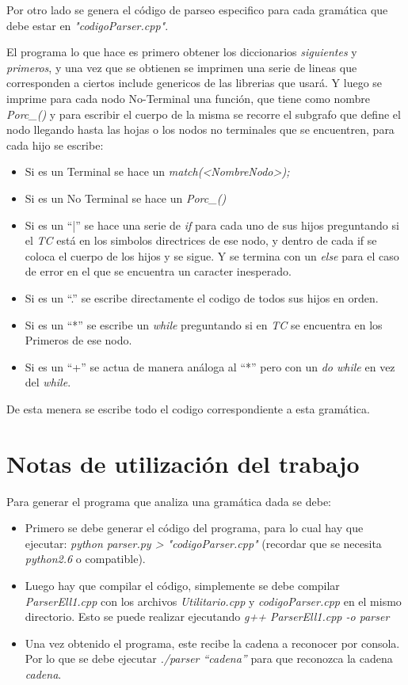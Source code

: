 \documentclass[a4paper]{report}
\begin{document}
Por otro lado se genera el código de parseo especifico para cada gramática que debe estar en \emph{"codigoParser.cpp"}.


El programa lo que hace es primero obtener los diccionarios \emph{siguientes} y \emph{primeros}, y una vez que se obtienen se imprimen una serie de lineas que corresponden a ciertos include genericos de las librerias que usará. Y luego se imprime para cada nodo No-Terminal una función, que tiene como nombre \emph{Porc\_<Nombre Nodo>()} y para escribir el cuerpo de la misma se recorre el subgrafo que define el nodo llegando hasta las hojas o los nodos no terminales que se encuentren, para cada hijo se escribe:


\begin{itemize}
\item Si es un Terminal se hace un \emph{match(<NombreNodo>);}
\item Si es un No Terminal se hace un \emph{Porc\_<Nombre Nodo>()}
\item Si es un ``|'' se hace una serie de \emph{if} para cada uno de sus hijos preguntando si el \emph{TC} está en los simbolos directrices de ese nodo, y dentro de cada if se coloca el cuerpo de los hijos y se sigue. Y se termina con un \emph{else} para el caso de error en el que se encuentra un caracter inesperado.
\item Si es un ``.'' se escribe directamente el codigo de todos sus hijos en orden.
\item Si es un ``*'' se escribe un \emph{while} preguntando si en \emph{TC} se encuentra en los Primeros de ese nodo.
\item Si es un ``+'' se actua de manera análoga al ``*'' pero con un \emph{do while} en vez del \emph{while}.
\end{itemize}


De esta menera se escribe todo el codigo correspondiente a esta gramática.

\section*{Notas de utilización del trabajo}

Para generar el programa que analiza una gramática dada se debe:
\begin{itemize}
\item Primero se debe generar el código del programa, para lo cual hay que ejecutar: \emph{python parser.py > "codigoParser.cpp"} (recordar que se necesita \emph{python2.6} o compatible).
\item Luego hay que compilar el código, simplemente se debe compilar \emph{ParserEll1.cpp} con los archivos \emph{Utilitario.cpp} y \emph{codigoParser.cpp} en el mismo directorio. Esto se puede realizar ejecutando \emph{g++ ParserEll1.cpp -o parser}
\item Una vez obtenido el programa, este recibe la cadena a reconocer por consola. Por lo que se debe ejecutar \emph{./parser ``cadena''} para que reconozca la cadena \emph{cadena}.
\end{itemize}
\end{document}
